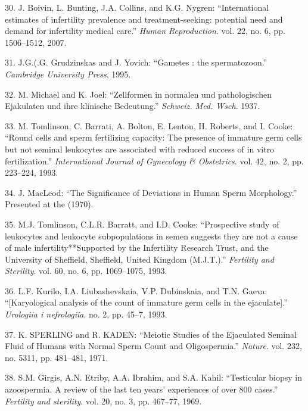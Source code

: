 \documentclass[12pt,twoside]{ugathesis}
\theoremstyle{definition}
\theoremstyle{definition}
\theoremstyle{remark}
\begin{document}
\hypertarget{ref-Boivin2007a}{}
30. J. Boivin, L. Bunting, J.A. Collins, and K.G. Nygren:
``International estimates of infertility prevalence and
treatment-seeking: potential need and demand for infertility medical
care.'' \emph{Human Reproduction}. vol. 22, no. 6, pp. 1506--1512, 2007.

\hypertarget{ref-Grudzinskas1995}{}
31. J.G.(.G. Grudzinskas and J. Yovich: ``Gametes : the spermatozoon.''
\emph{Cambridge University Press}, 1995.

\hypertarget{ref-Michael1937}{}
32. M. Michael and K. Joel: ``Zellformen in normalen und pathologischen
Ejakulaten und ihre klinische Bedeutung.'' \emph{Schweiz. Med. Wsch}.
1937.

\hypertarget{ref-Tomlinson1993a}{}
33. M. Tomlinson, C. Barrati, A. Bolton, E. Lenton, H. Roberts, and I.
Cooke: ``Round cells and sperm fertilizing capacity: The presence of
immature germ cells but not seminal leukocytes are associated with
reduced success of in vitro fertilization.'' \emph{International Journal
of Gynecology \& Obstetrics}. vol. 42, no. 2, pp. 223--224, 1993.

\hypertarget{ref-MacLeod1970}{}
34. J. MacLeod: ``The Significance of Deviations in Human Sperm
Morphology.'' Presented at the (1970).

\hypertarget{ref-Tomlinson1993}{}
35. M.J. Tomlinson, C.L.R. Barratt, and I.D. Cooke: ``Prospective study
of leukocytes and leukocyte subpopulations in semen suggests they are
not a cause of male infertility**Supported by the Infertility Research
Trust, and the University of Sheffield, Sheffield, United Kingdom
(M.J.T.).'' \emph{Fertility and Sterility}. vol. 60, no. 6, pp.
1069--1075, 1993.

\hypertarget{ref-Kurilo}{}
36. L.F. Kurilo, I.A. Liubashevskaia, V.P. Dubinskaia, and T.N. Gaeva:
``{[}Karyological analysis of the count of immature germ cells in the
ejaculate{]}.'' \emph{Urologiia i nefrologiia}. no. 2, pp. 45--7, 1993.

\hypertarget{ref-SPERLING1971}{}
37. K. SPERLING and R. KADEN: ``Meiotic Studies of the Ejaculated
Seminal Fluid of Humans with Normal Sperm Count and Oligospermia.''
\emph{Nature}. vol. 232, no. 5311, pp. 481--481, 1971.

\hypertarget{ref-Girgis}{}
38. S.M. Girgis, A.N. Etriby, A.A. Ibrahim, and S.A. Kahil: ``Testicular
biopsy in azoospermia. A review of the last ten years' experiences of
over 800 cases.'' \emph{Fertility and sterility}. vol. 20, no. 3, pp.
467--77, 1969.
\end{document}
